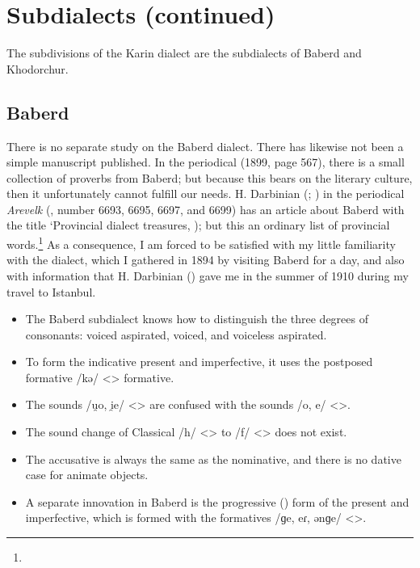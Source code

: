 \section{Subdialects (continued)}

The subdivisions of the Karin dialect are the subdialects of Baberd and Khodorchur. 


\begin{adjarianpage}\label{page:112}\end{adjarianpage}%

\subsection{Baberd}
There is no separate study on the Baberd dialect. There has likewise not been a simple manuscript published. In the periodical  (1899, page 567), there is a small collection of proverbs from Baberd; but because this bears on the literary culture, then it unfortunately cannot fulfill our needs. H. Darbinian (; ) in the periodical \textit{Arevelk} (, number 6693, 6695, 6697, and 6699) has an article about Baberd with the title `Provincial dialect treasures, ); but this an ordinary list of provincial words.\footnote{} As a consequence, I am forced to be satisfied with my little familiarity with the dialect, which I gathered in 1894 by visiting Baberd for a day, and also with information that H. Darbinian () gave me in the summer of 1910 during my travel to Istanbul. 

 

\begin{itemize}
	\item The Baberd subdialect knows how to distinguish the three degrees of consonants: voiced aspirated, voiced, and voiceless aspirated. 
	\item To form the indicative present and imperfective, it uses the postposed formative /kə/ <> formative. 
	\item The sounds /u̯o, i̯e/ <> are confused with the sounds /o, e/ <>.
	\item The sound change of Classical /h/ <> to /f/ <> does not exist.
	\item The accusative is always the same as the nominative, and there is no dative case for animate objects. 
	\item A separate innovation in Baberd is the progressive () form of the present and imperfective, which is formed with the formatives /ɡe, eɾ, ənɡe/ <>. 
\end{itemize}

